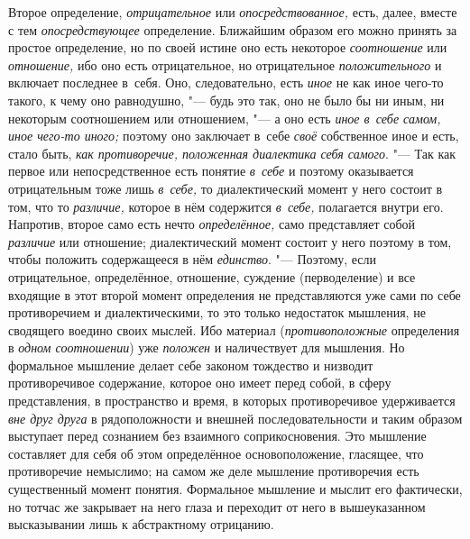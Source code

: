 Второе определение, {\em отрицательное} или
{\em опосредствованное,} есть, далее, вместе с тем {\em опосредствующее}
определение. Ближайшим образом его можно принять за простое
определение, но по своей истине оно есть некоторое
{\em соотношение} или {\em отношение,} ибо оно
есть отрицательное, но отрицательное {\em положительного} и
включает последнее в~себя. Оно, следовательно, есть {\em иное} не как
иное чего-то такого, к чему оно равнодушно, "--- будь это
так, оно не было бы ни иным, ни некоторым соотношением или отношением, "---
а оно есть {\em иное в~себе самом, иное чего-то иного;}
поэтому оно заключает в~себе
{\em своё} собственное иное и есть, стало быть, {\em как
противоречие, положенная диалектика себя самого}. "--- Так как
первое или непосредственное есть понятие {\em в~себе} и поэтому
оказывается отрицательным тоже лишь {\em в~себе,} то
диалектический момент у него состоит в том, что то
{\em различие,} которое в нём содержится {\em в~себе,}
полагается внутри его. Напротив, второе само есть нечто
{\em определённое,} само представляет собой {\em различие}
или отношение; диалектический момент состоит у него поэтому в
том, чтобы положить содержащееся в нём {\em единство}. "---
Поэтому, если отрицательное, определённое, отношение,
суждение (перводеление) и все входящие в этот второй момент определения не
представляются уже сами по себе противоречием и диалектическими, то это
только недостаток мышления, не сводящего воедино своих мыслей. Ибо материал
({\em противоположные} определения в {\em одном соотношении}) уже
{\em положен} и наличествует для мышления. Но формальное мышление делает
себе законом тождество и низводит противоречивое содержание,
которое оно имеет перед собой, в сферу представления, в пространство и
время, в которых противоречивое удерживается {\em вне друг друга} в
рядоположности и внешней последовательности и таким образом выступает перед
сознанием без взаимного соприкосновения. Это мышление составляет для себя
об этом определённое основоположение, гласящее, что противоречие немыслимо;
на самом же деле мышление противоречия есть существенный момент понятия.
Формальное мышление и мыслит его фактически, но тотчас же закрывает на него
глаза и переходит от него в вышеуказанном высказывании лишь к абстрактному
отрицанию.

